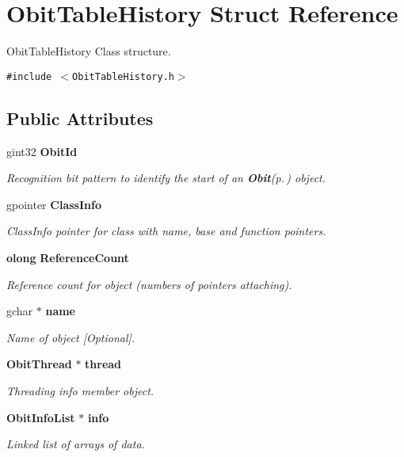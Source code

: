 \section{Obit\-Table\-History Struct Reference}
\label{structObitTableHistory}
Obit\-Table\-History Class structure.  


{\tt \#include $<$Obit\-Table\-History.h$>$}

\subsection*{Public Attributes}
\begin{CompactItemize}
\item 
gint32 {\bf Obit\-Id}
\begin{CompactList}\small\item\em Recognition bit pattern to identify the start of an {\bf Obit}{\rm (p.\,\pageref{structObit})} object. \item\end{CompactList}\item 
gpointer {\bf Class\-Info}
\begin{CompactList}\small\item\em Class\-Info pointer for class with name, base and function pointers. \item\end{CompactList}\item 
{\bf olong} {\bf Reference\-Count}
\begin{CompactList}\small\item\em Reference count for object (numbers of pointers attaching). \item\end{CompactList}\item 
gchar $\ast$ {\bf name}
\begin{CompactList}\small\item\em Name of object [Optional]. \item\end{CompactList}\item 
{\bf Obit\-Thread} $\ast$ {\bf thread}
\begin{CompactList}\small\item\em Threading info member object. \item\end{CompactList}\item 
{\bf Obit\-Info\-List} $\ast$ {\bf info}
\begin{CompactList}\small\item\em Linked list of arrays of data. \item\end{CompactList}\item 

\end{CompactItemize}
